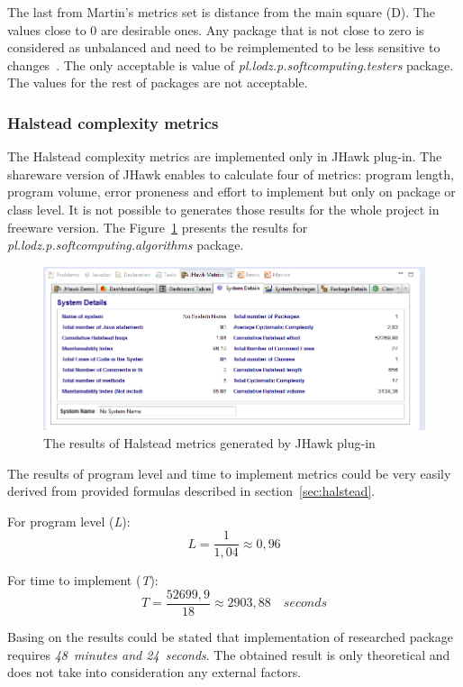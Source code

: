 The last from Martin's metrics set is distance from the main square (\ac{D}). The values close to 0 are desirable ones. Any package that is not close to zero is considered as unbalanced and need to be reimplemented to be less sensitive to changes~\cite{martin}. The only acceptable is value of \textit{pl.lodz.p.soft\-com\-pu\-ting.tes\-ters} package. The values for the rest of packages are not acceptable. 

\subsubsection*{Halstead complexity metrics}
The Halstead complexity metrics are implemented only in JHawk plug-in. The shareware version of JHawk enables to calculate four of metrics: program length, program volume, error proneness and effort to implement but only on package or class level. It is not possible to generates those results for the whole project in freeware version. The Figure~\ref{fig:jhawk3} presents the results for  \textit{pl.lodz.p.soft\-com\-pu\-ting.al\-go\-rithms} package. 

\begin{figure}[h!]
	\centering
	\includegraphics[scale=0.7]{img/jhawk3.png}  
	\caption{The results of Halstead metrics generated by JHawk plug-in}		
	\label{fig:jhawk3}
\end{figure}

The results of program level and time to implement metrics could be very easily derived from provided formulas described in section~\ref{sec:halstead}. 

For program level (\textit{L}):
\[L=\frac { 1 }{ 1,04 } \approx 0,96\]

For time to implement (\textit{T}):
\[T=\frac { 52699,9 }{ 18 } \approx 2903,88\quad seconds\]

Basing on the results could be stated that implementation of researched package requires \textit{48~minutes and 24~seconds}. The obtained result is only theoretical and does not take into consideration any external factors.  

